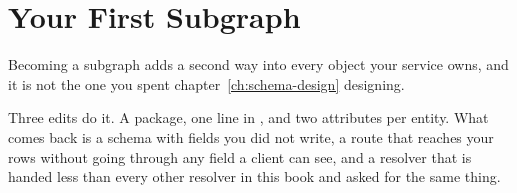 \chapter{Your First Subgraph}
\label{ch:first-subgraph}

Becoming a subgraph adds a second way into every object your service owns, and
it is not the one you spent chapter~\ref{ch:schema-design} designing.

Three edits do it. A package, one line in , and two attributes
per entity. What comes back is a schema with fields you did not write, a route
that reaches your rows without going through any field a client can see, and a
resolver that is handed less than every other resolver in this book and asked
for the same thing.








